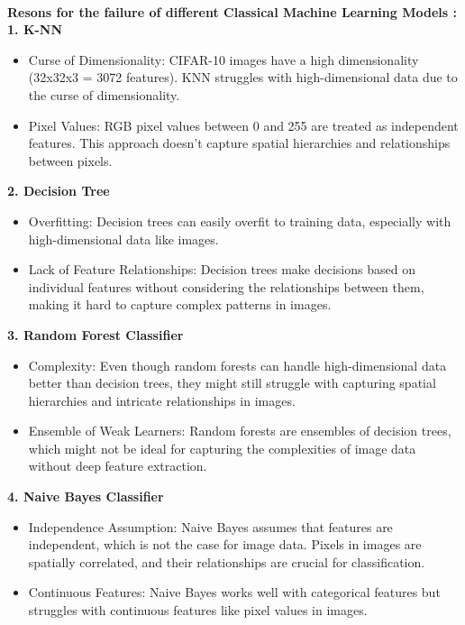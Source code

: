 \documentclass[a4paper]{article}
\theoremstyle{plain}
\theoremstyle{definition}
\begin{document}
\begin{enumerate}
\begin{table}[h!]
\end{table}\\
\vspace{.5cm}
\textbf{Resons for the failure of different Classical Machine Learning Models :}\\
\textbf{1. K-NN}
\begin{itemize}
    \item Curse of Dimensionality: CIFAR-10 images have a high dimensionality (32x32x3 = 3072 features). KNN struggles with high-dimensional data due to the curse of dimensionality.
    \item Pixel Values: RGB pixel values between 0 and 255 are treated as independent features. This approach doesn't capture spatial hierarchies and relationships between pixels.
\end{itemize}
\textbf{2. Decision Tree}
\begin{itemize}
    \item Overfitting: Decision trees can easily overfit to training data, especially with high-dimensional data like images.
    \item Lack of Feature Relationships: Decision trees make decisions based on individual features without considering the relationships between them, making it hard to capture complex patterns in images.
\end{itemize}
\textbf{3. Random Forest Classifier}
\begin{itemize}
    \item Complexity: Even though random forests can handle high-dimensional data better than decision trees, they might still struggle with capturing spatial hierarchies and intricate relationships in images.
    \item Ensemble of Weak Learners: Random forests are ensembles of decision trees, which might not be ideal for capturing the complexities of image data without deep feature extraction.
\end{itemize}
\textbf{4. Naive Bayes Classifier}
\begin{itemize}
    \item Independence Assumption: Naive Bayes assumes that features are independent, which is not the case for image data. Pixels in images are spatially correlated, and their relationships are crucial for classification.
    \item Continuous Features: Naive Bayes works well with categorical features but struggles with continuous features like pixel values in images.
\end{itemize}

\end{enumerate}
\end{document}
